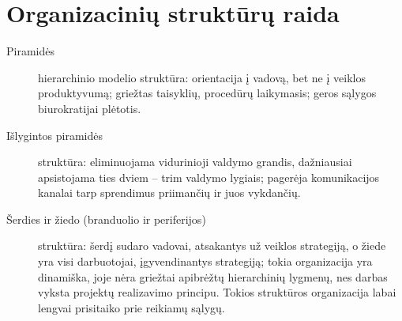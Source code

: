 \section{Organizacinių struktūrų raida}

\begin{description}
  \item[Piramidės] hierarchinio modelio struktūra: orientacija į
    vadovą, bet ne į veiklos produktyvumą; griežtas taisyklių,
    procedūrų laikymasis; geros sąlygos biurokratijai plėtotis.
  \item[Išlygintos piramidės] struktūra: eliminuojama vidurinioji
    valdymo grandis, dažniausiai apsistojama ties dviem – trim valdymo
    lygiais; pagerėja komunikacijos kanalai tarp sprendimus
    priimančių ir juos vykdančių.
  \item[Šerdies ir žiedo (branduolio ir periferijos)] struktūra:
    šerdį sudaro vadovai, atsakantys už veiklos strategiją, o žiede
    yra visi darbuotojai, įgyvendinantys strategiją; tokia organizacija
    yra dinamiška, joje nėra griežtai apibrėžtų hierarchinių lygmenų,
    nes darbas vyksta projektų realizavimo principu. Tokios struktūros
    organizacija labai lengvai prisitaiko prie reikiamų sąlygų.
\end{description}
